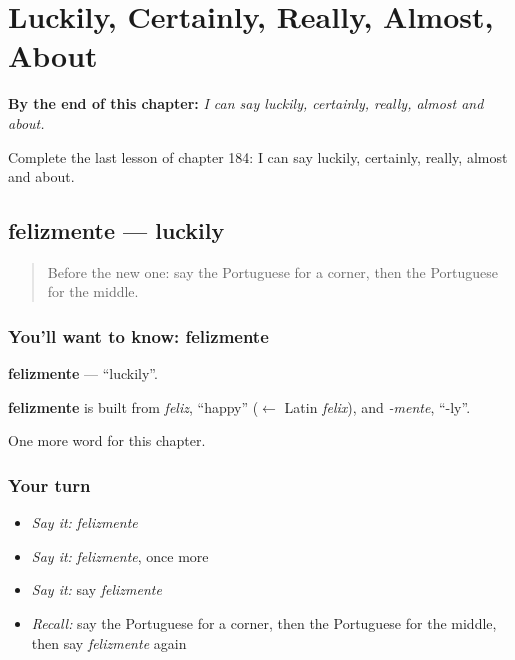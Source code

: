 
\chapter{Luckily, Certainly, Really, Almost, About}
\label{ch:pt-luckily-certainly-really-almost-about}

\begin{chapteropening}
\textbf{By the end of this chapter:} \emph{I can say luckily, certainly, really, almost and about.}

Complete the last lesson of chapter 184: I can say luckily, certainly, really, almost and about.
\end{chapteropening}

\section[felizmente]{felizmente — luckily}

\label{lesson:PT-C184-felizmente}



\begin{quote}
Before the new one: say the Portuguese for a corner, then the Portuguese for the middle.
\end{quote}

\subsection*{You'll want to know: felizmente}
\textbf{felizmente} — \textquotedblleft{}luckily\textquotedblright{}.

\begin{cousinweb}
\textbf{felizmente} is built from \emph{feliz}, \textquotedblleft{}happy\textquotedblright{} ($\leftarrow$ Latin \emph{felix}), and \emph{-mente}, \textquotedblleft{}-ly\textquotedblright{}.
\end{cousinweb}

\begin{grammarlens}[title={What you've built}]
One more word for this chapter.
\end{grammarlens}

\subsection*{Your turn}
\begin{itemize}
\raggedright
  \item \emph{Say it:} \emph{felizmente}
  \item \emph{Say it:} \emph{felizmente}, once more
  \item \emph{Say it:} say \emph{felizmente}
  \item \emph{Recall:} say the Portuguese for a corner, then the Portuguese for the middle, then say \emph{felizmente} again
\end{itemize}

